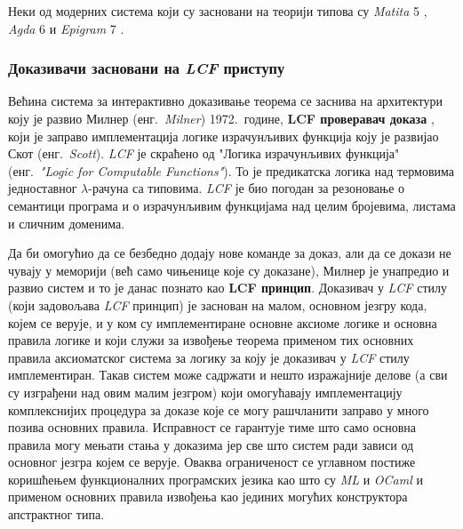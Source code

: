 Неки од модерних система који су засновани на теорији типова су
\emph{Matita} 5 \cite{matita}, \emph{Agda} 6 \cite{agda6} и
\emph{Epigram} 7 \cite{epigram}.

\subsubsection{Доказивачи засновани на \emph{LCF} приступу}

Већина система за интерактивно доказивање теорема се заснива на
архитектури коју је развио Милнер (енг.~\emph{Milner}) 1972.~године,
\textbf{LCF проверавач доказа} \cite{lcf1}, који је заправо
имплементација логике израчунљивих функција коју је развијао Скот
(енг.~\emph{Scott}).  \emph{LCF} је скраћено од "Логика израчунљивих
функција" (енг.~\emph{"Logic for Computable Functions"}). То је
предикатска логика над термовима једноставног $\lambda$-рачуна са
типовима.  \emph{LCF} је био погодан за резоновање о семантици
програма и о израчунљивим функцијама над целим бројевима, листама и
сличним доменима.

Да би омогућио да се безбедно додају нове команде за доказ, али да се
докази не чувају у меморији (већ само чињенице које су доказане),
Милнер је унапредио и развио систем и то је данас познато као
\textbf{LCF принцип}. Доказивач у \emph{LCF} стилу (који задовољава
\emph{LCF} принцип) је заснован на малом, основном језгру кода, којем
се верује, и у ком су имплементиране основне аксиоме логике и основна
правила логике и који служи за извођење теорема применом тих основних
правила аксиоматског система за логику за коју је доказивач у
\emph{LCF} стилу имплементиран. Такав систем може садржати и нешто
изражајније делове (а сви су изграђени над овим малим језгром) који
омогућавају имплементацију комплекснијих процедура за доказе које се
могу рашчланити заправо у много позива основних правила.  Исправност
се гарантује тиме што само основна правила могу мењати стања у
доказима јер све што систем ради зависи од основног језгра којем се
верује. Оваква ограниченост се углавном постиже коришћењем
функционалних програмских језика као што су \emph{ML}
\cite{standardML} и \emph{OCaml} \cite{ocaml} и применом основних
правила извођења као јединих могућих конструктора апстрактног типа.


